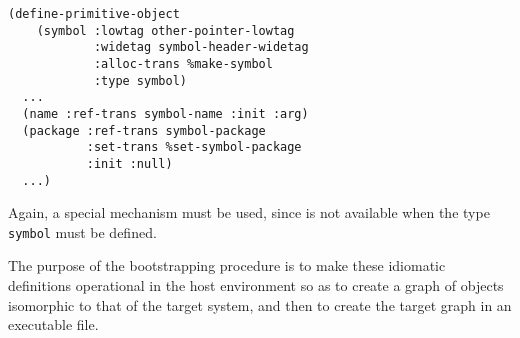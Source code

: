\begin{verbatim}
(define-primitive-object
    (symbol :lowtag other-pointer-lowtag
            :widetag symbol-header-widetag
            :alloc-trans %make-symbol
            :type symbol)
  ...
  (name :ref-trans symbol-name :init :arg)
  (package :ref-trans symbol-package
           :set-trans %set-symbol-package
           :init :null)
  ...)
\end{verbatim}

\noindent
Again, a special mechanism must be used, since \clos{} is not
available when the type \texttt{symbol} must be defined.

The purpose of the \sicl{} bootstrapping procedure is to make these
idiomatic definitions operational in the host environment so as to
create a graph of objects isomorphic to that of the target system, and
then to create the target graph in an executable file.

